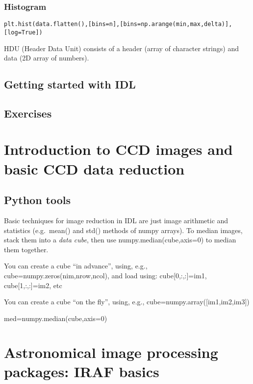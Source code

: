 \documentclass{article}
\begin{document}
\subsubsection*{Histogram}
\begin{itemize*}
    \item \verb|plt.hist(data.flatten(),[bins=n],[bins=np.arange(min,max,delta)],[log=True])|
\end{itemize*}

HDU (Header Data Unit) consists of a header (array of character strings) and
data (2D array of numbers).

\subsection*{Getting started with IDL}
\subsection*{Exercises}

\section*{Introduction to CCD images and basic CCD data reduction}

\subsection*{Python tools}

Basic techniques for image reduction in IDL are just image arithmetic
and statistics (e.g.\ mean() and std() methods of numpy arrays). To
median images, stack them into a \emph{data cube}, then use
numpy.median(cube,axis=0) to median them together.
\begin{itemize*}
    \item You can create a cube ``in advance'', using, e.g.,
        cube=numpy.zeros(nim,nrow,ncol), and load using: cube[0,:,:]=im1,
        cube[1,:,:]=im2, etc
    \item You can create a cube ``on the fly'', using, e.g.,
        cube=numpy.array([im1,im2,im3])
    \item med=numpy.median(cube,axis=0)
\end{itemize*}

\section*{Astronomical image processing packages: IRAF basics}
\end{document}
